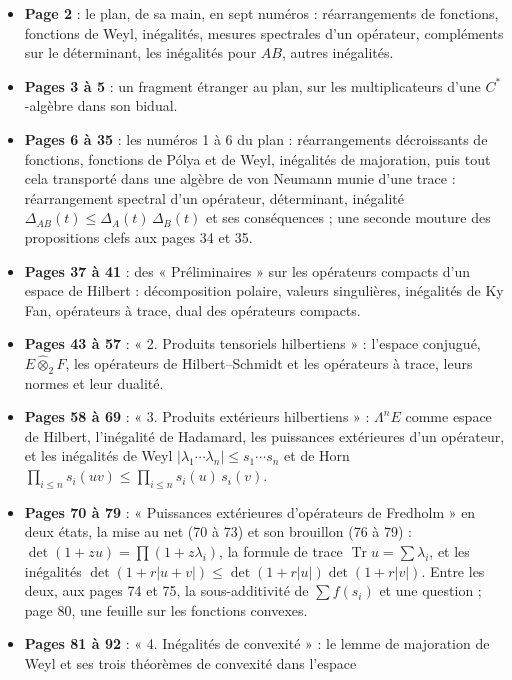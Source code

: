 \documentclass[11pt,a4paper]{article}
\begin{document}
\begin{itemize}
  \item \textbf{Page 2} : le plan, de sa main, en sept numéros :
    réarrangements de fonctions, fonctions de Weyl, inégalités, mesures
    spectrales d'un opérateur, compléments sur le déterminant, les
    inégalités pour $AB$, autres inégalités.
  \item \textbf{Pages 3 à 5} : un fragment étranger au plan, sur les
    multiplicateurs d'une $C^{*}$-algèbre dans son bidual.
  \item \textbf{Pages 6 à 35} : les numéros 1 à 6 du plan : réarrangements
    décroissants de fonctions, fonctions de Pólya et de Weyl, inégalités de
    majoration, puis tout cela transporté dans une algèbre de von Neumann
    munie d'une trace : réarrangement spectral d'un opérateur, déterminant,
    inégalité $\Delta_{AB}(t) \leq \Delta_A(t)\,\Delta_B(t)$ et ses
    conséquences ; une seconde mouture des propositions clefs aux pages 34
    et 35.
  \item \textbf{Pages 37 à 41} : des « Préliminaires » sur les opérateurs
    compacts d'un espace de Hilbert : décomposition polaire, valeurs
    singulières, inégalités de Ky Fan, opérateurs à trace, dual des
    opérateurs compacts.
  \item \textbf{Pages 43 à 57} : « 2. Produits tensoriels hilbertiens » :
    l'espace conjugué, $E \mathbin{\hat\otimes}_2 F$, les opérateurs de
    Hilbert--Schmidt et les opérateurs à trace, leurs normes et leur dualité.
  \item \textbf{Pages 58 à 69} : « 3. Produits extérieurs hilbertiens » :
    $\Lambda^n E$ comme espace de Hilbert, l'inégalité de Hadamard, les
    puissances extérieures d'un opérateur, et les inégalités de Weyl
    $|\lambda_1 \cdots \lambda_n| \leq s_1 \cdots s_n$ et de Horn
    $\prod_{i \leq n} s_i(uv) \leq \prod_{i \leq n} s_i(u)\,s_i(v)$.
  \item \textbf{Pages 70 à 79} : « Puissances extérieures d'opérateurs de
    Fredholm » en deux états, la mise au net (70 à 73) et son brouillon (76 à
    79) : $\det(1+zu) = \prod(1+z\lambda_i)$, la formule de trace
    $\operatorname{Tr} u = \sum \lambda_i$, et les inégalités
    $\det(1+r|u+v|) \leq \det(1+r|u|)\det(1+r|v|)$. Entre les deux, aux pages
    74 et 75, la sous-additivité de $\sum f(s_i)$ et une question ; page 80,
    une feuille sur les fonctions convexes.
  \item \textbf{Pages 81 à 92} : « 4. Inégalités de convexité » : le lemme
    de majoration de Weyl et ses trois théorèmes de convexité dans l'espace

\end{itemize}
\end{document}
